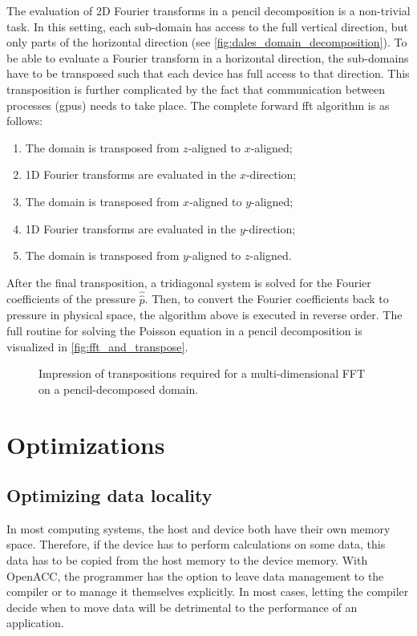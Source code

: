 The evaluation of 2D Fourier transforms in a pencil decomposition is a non-trivial task. In this setting, each sub-domain has access to the full vertical direction, but only parts of the horizontal direction (see \autoref{fig:dales_domain_decomposition}). To be able to evaluate a Fourier transform in a horizontal direction, the sub-domains have to be transposed such that each device has full access to that direction. This transposition is further complicated by the fact that communication between processes (\acrshort{gpu}s) needs to take place. The complete forward \acrshort{fft} algorithm is as follows:

\begin{enumerate}
  \item The domain is transposed from $z$-aligned to $x$-aligned;
  \item 1D Fourier transforms are evaluated in the $x$-direction;
  \item The domain is transposed from $x$-aligned to $y$-aligned;
  \item 1D Fourier transforms are evaluated in the $y$-direction;
  \item The domain is transposed from $y$-aligned to $z$-aligned.
\end{enumerate}

After the final transposition, a tridiagonal system is solved for the Fourier coefficients of the pressure $\hat{\hat{p}}$. Then, to convert the Fourier coefficients back to pressure in physical space, the algorithm above is executed in reverse order. The full routine for solving the Poisson equation in a pencil decomposition is visualized in \autoref{fig:fft_and_transpose}.

\vfill \pagebreak

\begin{figure}[H]
  \centering
  
  \caption{Impression of transpositions required for a multi-dimensional FFT on a pencil-decomposed domain.}
  \label{fig:fft_and_transpose}
\end{figure}


\section{Optimizations}

\subsection{Optimizing data locality}
In most computing systems, the host and device both have their own memory space. Therefore, if the device has to perform calculations on some data, this data has to be copied from the host memory to the device memory. With OpenACC, the programmer has the option to leave data management to the compiler or to manage it themselves explicitly. In most cases, letting the compiler decide when to move data will be detrimental to the performance of an application.

